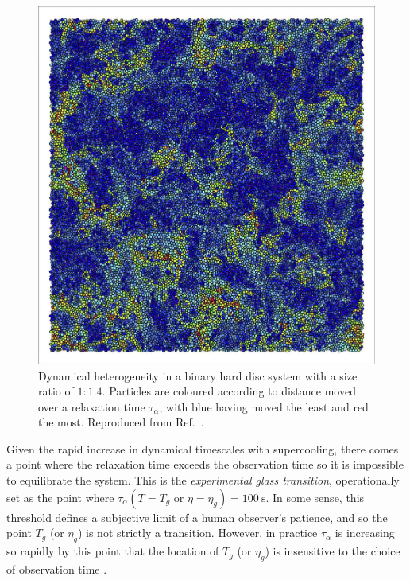 \documentclass[11pt,twoside]{report}
\begin{document}
\begin{figure}
  \includegraphics[width=0.7\linewidth,outer]{dynamic-heterogeneity}
  \caption[Dynamical heterogeneity in binary hard discs]{
    Dynamical heterogeneity in a binary hard disc system with a size ratio of $1:1.4$.
    Particles are coloured according to distance moved over a relaxation time $\tau_\alpha$, with blue having moved the least and red the most.
    Reproduced from Ref.\ \cite{RoyallPR2015}.
  }
  \label{fig:dynamic-heterogeneities}
\end{figure}

Given the rapid increase in dynamical timescales with supercooling, there comes a point where the relaxation time exceeds the observation time so it is impossible to equilibrate the system.
This is the \emph{experimental glass transition}, operationally set as the point where $\tau_\alpha(T = T_g \textrm{ or } \eta = \eta_g) = \SI{100}{\second}$.
In some sense, this threshold defines a subjective limit of a human observer's patience, and so the point $T_g$ (or $\eta_g$) is not strictly a transition.
However, in practice $\tau_\alpha$ is increasing so rapidly by this point that the location of $T_g$ (or $\eta_g$) is insensitive to the choice of observation time \cite{CavagnaPR2009}.
\end{document}
